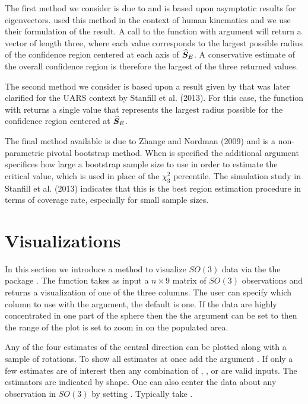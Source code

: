 The first method we consider is due to \cite{prentice1986} and is based upon asymptotic results for eigenvectors.  \cite{rancourt2000} used this method in the context of human kinematics and we use their formulation of the result.  A call to the  function with argument  will return a vector of length three, where each value corresponds to the largest possible radius of the confidence region centered at each axis of $\widehat{\bm S}_E$.  A conservative estimate of the overall confidence region is therefore the largest of the three returned values.

The second method we consider is based upon a result given by \cite{chang2001} that was later clarified for the UARS context by Stanfill et al. (2013).  For this case, the  function with  returns a single value that represents the largest radius possible for the confidence region centered at $\widehat{\bm S}_E$.

The final method available is due to Zhange and Nordman (2009) and is a non-parametric pivotal bootstrap method.  When  is specified the additional  argument specifices how large a bootstrap sample size to use in order to estimate the critical value, which is used in place of the $\chi^2_3$ percentile.  The simulation study in Stanfill et al. (2013) indicates that this is the best region estimation procedure in terms of coverage rate, especially for small sample sizes.


\section{Visualizations}
In this section we introduce a method to visualize $SO(3)$ data via the the  package \citep{wickham2009}.  The function  takes as input a $n\times 9$ matrix of $SO(3)$ observations and returns a visualization of one of the three columns.  The user can specify which column to use with the  argument, the default is one.  If the data are highly concentrated in one part of the sphere then the the  argument can be set to  then the range of the plot is set to zoom in on the populated area. 

Any of the four estimates of the central direction can be plotted along with a sample of rotations. To show all estimates at once add the argument .  If only a few estimates are of interest then any combination of , ,  or  are valid inputs.  The estimators are indicated by shape.  One can also center the data about any observation in $SO(3)$ by setting .   Typically take .  

